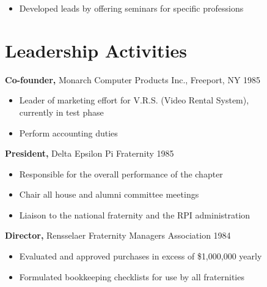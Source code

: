 \documentclass[margin]{res}
\begin{document}
\begin{resume}
\begin{itemize}
                 \item Developed leads by offering seminars for specific 
                 professions 

		 \end{itemize}

\section{Leadership   Activities} 
               {\bf Co-founder,} Monarch Computer Products Inc., Freeport, NY    \hfill         1985 
                \begin{itemize} \itemsep -2pt
              \item Leader of marketing effort for V.R.S. (Video 
                 Rental System), \\
                  currently in test phase 
                 
                \item  Perform accounting duties 

		 \end{itemize}

		{\bf President,} Delta Epsilon Pi Fraternity \hfill   1985 
                \begin{itemize} \itemsep -2pt
                 \item  Responsible for the overall performance of the 
                 chapter 
                
                 \item Chair all house and alumni committee meetings 
                
                 \item Liaison to the national fraternity and the RPI 
                 administration 
		 \end{itemize}

                  {\bf  Director,}  Rensselaer Fraternity Managers 
              Association     \hfill                                 1984 
                 \begin{itemize} \itemsep -2pt

               \item    Evaluated and approved purchases in excess of 
                 {\$}1,000,000 yearly 
                 
               \item  Formulated bookkeeping checklists for use by all 
                 fraternities 
		 \end{itemize}


\end{resume}
\end{document}
